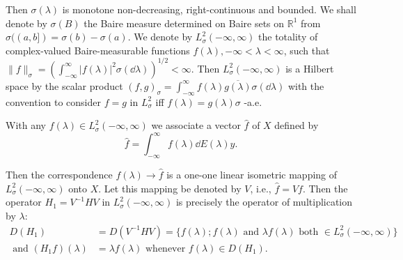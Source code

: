 Then $\sigma(\lambda)$ is monotone non-decreasing, right-continuous and bounded. We shall denote by $\sigma(B)$ the Baire measure determined on Baire sets on $\mathbb{R}^{1}$ from $\sigma((a,b]) = \sigma(b) - \sigma(a)$. We denote by $L_{\sigma}^{2}(-\infty,\infty)$ the totality of complex-valued Baire-measurable functions $f(\lambda), -\infty < \lambda < \infty$, such that $\|f\|_{\sigma} = \left(\int_{-\infty}^{\infty}|f(\lambda)|^{2}\sigma(\dd\lambda)\right)^{1/2} < \infty$. Then $L_{\sigma}^{2}(-\infty,\infty)$ is a Hilbert space by the scalar product $(f,g)_{\sigma} = \int_{-\infty}^{\infty}f(\lambda)\overline{g(\lambda)}\sigma(\dd\lambda)$ with the convention to consider $f = g$ in $L_{\sigma}^{2}$ iff $f(\lambda) = g(\lambda)\sigma$ -a.e. 

\begin{theoremu} With any $f(\lambda) \in L_{\sigma}^{2}(-\infty, \infty)$ we associate a vector $\hat{f}$ of $X$ defined by 
\begin{equation}\label{eq:XI.14.2}
\hat {f} = \int_{- \infty} ^{\infty} f (\lambda) \dd E (\lambda) y.
\end{equation}
\end{theoremu}

Then the correspondence $f(\lambda) \to \hat{f}$ is a one-one linear isometric mapping of $L_{\sigma}^{2}(-\infty, \infty)$ onto $X$. Let this mapping be denoted by $V$, i.e., $\hat{f} = Vf$. Then the operator $H_{1} = V^{-1}HV$ in $L_{\sigma}^{2}(-\infty, \infty)$ is precisely the 
operator of multiplication by $\lambda$: 
\begin{equation}\label{eq:XI.14.3}
\begin{aligned}
D (H _{1}) &= D (V ^{-1} H V) = \{f (\lambda); f (\lambda) \text{ and } \lambda f (\lambda) \text{ both } \in L _{\sigma} ^{2} (- \infty , \infty) \}
\\
\text{ and } (H _{1} f) (\lambda) &= \lambda f (\lambda) \text{ whenever } f (\lambda) \in D (H _{1}).
\end{aligned}
\end{equation}

